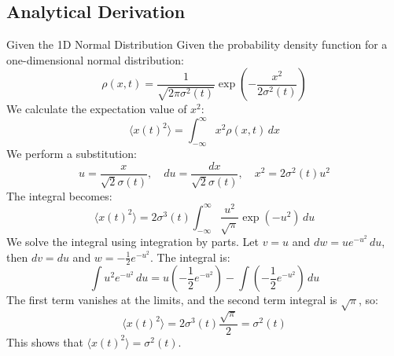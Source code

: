 \documentclass[11pt]{article}
\begin{document}
\subsection{Analytical Derivation}
Given the 1D Normal Distribution
Given the probability density function for a one-dimensional normal distribution:
\begin{equation}
    \rho(x,t) = \frac{1}{\sqrt{2\pi\sigma^2(t)}} \exp\left(-\frac{x^2}{2\sigma^2(t)}\right)
\end{equation}
We calculate the expectation value of \( x^2 \):
\begin{equation}
    \langle x(t)^2 \rangle = \int_{-\infty}^{\infty} x^2 \rho(x,t) \, dx
\end{equation}
We perform a substitution:
\begin{equation}
    u = \frac{x}{\sqrt{2}\sigma(t)}, \quad du = \frac{dx}{\sqrt{2}\sigma(t)}, \quad x^2 = 2\sigma^2(t)u^2
\end{equation}
The integral becomes:
\begin{equation}
    \langle x(t)^2 \rangle = 2\sigma^3(t) \int_{-\infty}^{\infty} \frac{u^2}{\sqrt{\pi}} \exp(-u^2) \, du
\end{equation}
We solve the integral using integration by parts. Let \( v = u \) and \( dw = u e^{-u^2} \, du \), then \( dv = du \) and \( w = -\frac{1}{2}e^{-u^2} \). The integral is:
\begin{equation}
    \int u^2 e^{-u^2} \, du = u \left(-\frac{1}{2}e^{-u^2}\right) - \int \left(-\frac{1}{2}e^{-u^2}\right) \, du
\end{equation}
The first term vanishes at the limits, and the second term integral is \(\sqrt{\pi}\), so:
\begin{equation}
    \langle x(t)^2 \rangle = 2\sigma^3(t) \frac{\sqrt{\pi}}{2} = \sigma^2(t)
\end{equation}
This shows that \( \langle x(t)^2 \rangle = \sigma^2(t) \).
\end{document}
